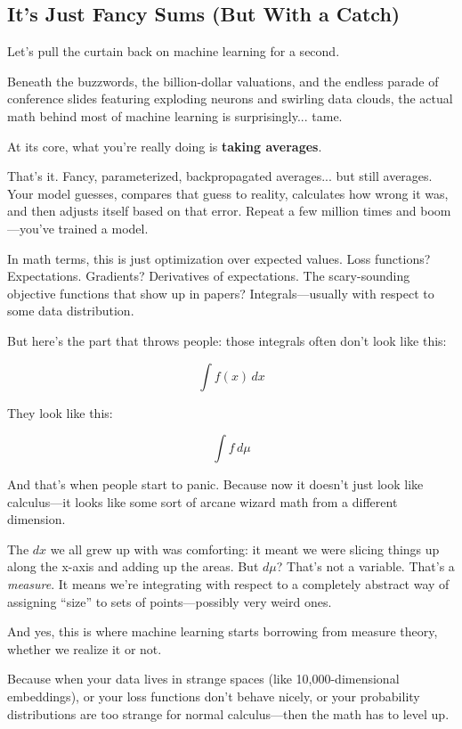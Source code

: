 \subsection{It’s Just Fancy Sums (But With a Catch)}

Let’s pull the curtain back on machine learning for a second.

Beneath the buzzwords, the billion-dollar valuations, and the endless parade of conference slides featuring exploding neurons and swirling data clouds, the actual math behind most of machine learning is surprisingly... tame.

At its core, what you’re really doing is \textbf{taking averages}.

That’s it. Fancy, parameterized, backpropagated averages... but still averages. Your model guesses, compares that guess to reality, calculates how wrong it was, and then adjusts itself based on that error. Repeat a few million times and boom—you’ve trained a model.

In math terms, this is just optimization over expected values. Loss functions? Expectations. Gradients? Derivatives of expectations. The scary-sounding objective functions that show up in papers? Integrals—usually with respect to some data distribution.

But here’s the part that throws people: those integrals often don’t look like this:

\[
\int f(x)\,dx
\]

They look like this:

\[
\int f \, d\mu
\]

And that’s when people start to panic. Because now it doesn’t just look like calculus—it looks like some sort of arcane wizard math from a different dimension.

The \( dx \) we all grew up with was comforting: it meant we were slicing things up along the x-axis and adding up the areas. But \( d\mu \)? That’s not a variable. That’s a \textit{measure}. It means we’re integrating with respect to a completely abstract way of assigning “size” to sets of points—possibly very weird ones.

And yes, this is where machine learning starts borrowing from measure theory, whether we realize it or not.

Because when your data lives in strange spaces (like 10,000-dimensional embeddings), or your loss functions don’t behave nicely, or your probability distributions are too strange for normal calculus—then the math has to level up.

